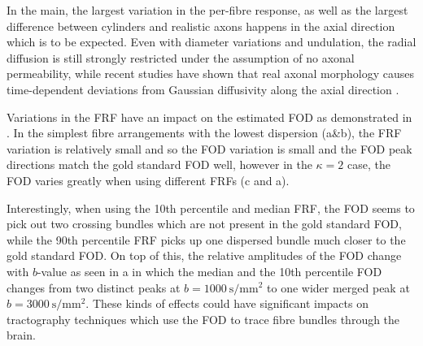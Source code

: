 In the main, the largest variation in the per-fibre response, as well as the largest difference between cylinders and realistic axons happens in the axial direction which is to be expected. Even with diameter variations and undulation, the radial diffusion is still strongly restricted under the assumption of no axonal permeability, while recent studies have shown that real axonal morphology causes time-dependent deviations from Gaussian diffusivity along the axial direction \cite{Lee2019a}.

Variations in the \ac{FRF} have an impact on the estimated \ac{FOD} as demonstrated in . In the simplest fibre arrangements with the lowest dispersion (a\&b), the \ac{FRF} variation is relatively small and so the \ac{FOD} variation is small and the \ac{FOD} peak directions match the gold standard \ac{FOD} well, however in the $\kappa=2$ case, the \ac{FOD} varies greatly when using different \ac{FRF}s (c and a).

Interestingly, when using the 10th percentile and median \ac{FRF}, the \ac{FOD} seems to pick out two crossing bundles which are not present in the gold standard \ac{FOD}, while the 90th percentile \ac{FRF} picks up one dispersed bundle much closer to the gold standard \ac{FOD}. On top of this, the relative amplitudes of the \ac{FOD} change with $b$-value as seen in a in which the median and the 10th percentile \ac{FOD} changes from two distinct peaks at $b=\SI{1000}{\second\per\milli\metre\squared}$ to one wider merged peak at $b=\SI{3000}{\second\per\milli\metre\squared}$.
These kinds of effects could have significant impacts on tractography techniques which use the \ac{FOD} to trace fibre bundles through the brain.

